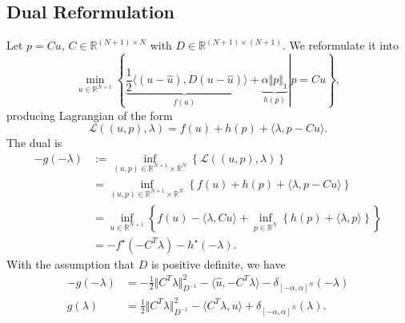 \documentclass[]{article}
\theoremstyle{definition}
\numberwithin{equation}{subsection}
\begin{document}
    \subsection*{Dual Reformulation}
        Let $p = Cu$, $C\in \mathbb R^{(N + 1)\times N}$ with $D \in \mathbb R^{(N + 1)\times (N + 1)}$. We reformulate it into 
        \[
            \min_{u\in \mathbb R^{N + 1}}     
            \left\lbrace
                \left.
                    \underbrace{\frac{1}{2}\langle (u - \hat u), D(u - \hat u)}_{f(u)}\rangle 
                    + 
                    \underbrace{\alpha \Vert p\Vert_1}_{h(p)}
                \right| 
                p = Cu
            \right\rbrace, 
        \]
        producing Lagrangian of the form 
        \[
            \mathcal L((u, p), \lambda) = 
            f(u) + h(p) + \langle \lambda, p - Cu\rangle. 
        \]
        The dual is
        \begin{align*}
            - g(-\lambda) &:= \inf_{(u, p)\in \mathbb R^{N + 1}\times \mathbb R^N}
            \left\lbrace
                \mathcal L({(u, p), \lambda})
            \right\rbrace
            \\
            &= \inf_{(u, p)\in \mathbb R^{N + 1}\times \mathbb R^N}
            \left\lbrace
                f(u) + h(p) + \langle \lambda, p - Cu\rangle
            \right\rbrace
            \\
            &= 
            \inf_{u\in \mathbb R^{N + 1}}
            \left\lbrace
                f(u) - \langle \lambda, Cu\rangle 
                + 
                \inf_{p\in \mathbb R^{N}}
                \left\lbrace
                    h(p) + \langle \lambda, p\rangle  
                \right\rbrace
            \right\rbrace
            \\
            &=
            -f^\star (-C^T\lambda) - h^\star(-\lambda). 
        \end{align*}
        With the assumption that $D$ is positive definite, we have 
        \begin{align*}
            - g(-\lambda) &= -\frac{1}{2}   \Vert C^T\lambda\Vert^2_{D^{-1}} - 
            \langle \hat u, - C^T \lambda\rangle - 
            \delta_{[-\alpha, \alpha]^N}(-\lambda)
            \\
            g(\lambda) &= \frac{1}{2} \Vert C^T\lambda\Vert_{D^{-1}}^2 - 
            \langle C^T\lambda, u\rangle + \delta_{[-\alpha, \alpha]^N}(\lambda). 
        \end{align*}
\end{document}
